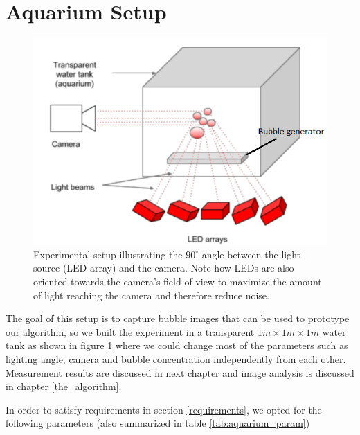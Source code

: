 	\section{Aquarium Setup}
		\begin{figure}
			\centering
			\includegraphics[scale=1]{images/aquarium_setup}
			\caption{Experimental setup illustrating the $90^\circ$ angle between the light source (LED array) and the camera. Note how LEDs are also oriented towards the camera's field of view to maximize the amount of light reaching the camera and therefore reduce noise.}
			\label{fig:aquarium_setup}
		\end{figure}			
		
		The goal of this setup is to capture bubble images that can be used to prototype our algorithm, so we built the experiment in a transparent $1m \times 1m \times 1m$ water tank as shown in figure \ref{fig:aquarium_setup} where we could change most of the parameters such as lighting angle, camera and bubble concentration independently from each other. Measurement results are discussed in next chapter and image analysis is discussed in chapter \ref{the_algorithm}.
		
		In order to satisfy requirements in section \ref{requirements}, we opted for the following parameters (also summarized in table \ref{tab:aquarium_param})
		
